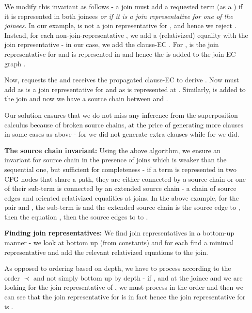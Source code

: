 We modify this invariant as follows - a join must add a requested term (as a \GT{}) if it is represented in both joinees \emph{or if it is a join representative for one of the joinees}. In our example,  is not a join representative for , and hence we reject . Instead, for each non-join-representative \GT{}, we add a (relativized) equality with the join representative - in our case, 
we add the clause-EC . For ,  is the join representative for  and  is represented in  and hence the \GT{}  is added to the join EC-graph .

Now,  requests the \GFA{}  and receives the propagated clause-EC   to derive
. Now  must add  as  is a join representative for  and as  is represented at . Similarly,  is added to the join and now we have a source chain between  and .

Our solution ensures that we do not miss any inference from the superposition calculus because of broken source chains, at the price of generating more clauses in some cases as above - for  we did not generate extra clauses while for  we did.

\textbf{The source chain invariant:}
Using the above algorithm, we ensure an invariant for source chain in the presence of joins which is weaker than the sequential one, but sufficient for completeness - if a term is represented in two CFG-nodes that share a path, they are either connected by a source chain or one of their sub-term is connected by an extended source chain - a chain of source edges and oriented relativized equalities at joins.
In the above example, for the pair  and , the sub-term is  and the extended source chain is the source edge  to , then the equation , then the source edges  to  to .

\textbf{Finding join representatives:}
We find join representatives in a bottom-up manner - we look at  bottom up (from constants) and for each \GT{} find a minimal representative and add the relevant relativized equations to the join. 

As opposed to ordering based on depth, we have to process \GTs{} according to the order $\prec$ and not simply bottom up by depth - 
if , and at the joinee  and we are looking for the join representative of , we must process \GTs{} in the order \m{[a], [f(a)], [f(f(a))], [c]} and then we can see that the join representative for \m{[c]} is in fact \m{[f(f(a))]} hence the join representative for  is \m{[g(f(f(a)))]}.

